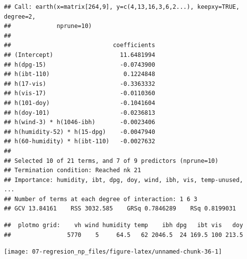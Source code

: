\documentclass[
  spanish,
]{book}
\newenvironment{Shaded}{\begin{snugshade}}{\end{snugshade}}
\newcommand{\CommentTok}[1]{\textcolor[rgb]{0.56,0.35,0.01}{\textit{#1}}}
\newcommand{\DataTypeTok}[1]{\textcolor[rgb]{0.13,0.29,0.53}{#1}}
\newcommand{\DecValTok}[1]{\textcolor[rgb]{0.00,0.00,0.81}{#1}}
\newcommand{\KeywordTok}[1]{\textcolor[rgb]{0.13,0.29,0.53}{\textbf{#1}}}
\newcommand{\NormalTok}[1]{#1}
\newcommand{\OperatorTok}[1]{\textcolor[rgb]{0.81,0.36,0.00}{\textbf{#1}}}
\newcommand{\StringTok}[1]{\textcolor[rgb]{0.31,0.60,0.02}{#1}}
\theoremstyle{break}
\theoremstyle{definition}
\theoremstyle{definition}
\theoremstyle{definition}
\theoremstyle{remark}
\begin{document}
\begin{verbatim}
## Call: earth(x=matrix[264,9], y=c(4,13,16,3,6,2...), keepxy=TRUE, degree=2,
##             nprune=10)
## 
##                             coefficients
## (Intercept)                   11.6481994
## h(dpg-15)                     -0.0743900
## h(ibt-110)                     0.1224848
## h(17-vis)                     -0.3363332
## h(vis-17)                     -0.0110360
## h(101-doy)                    -0.1041604
## h(doy-101)                    -0.0236813
## h(wind-3) * h(1046-ibh)       -0.0023406
## h(humidity-52) * h(15-dpg)    -0.0047940
## h(60-humidity) * h(ibt-110)   -0.0027632
## 
## Selected 10 of 21 terms, and 7 of 9 predictors (nprune=10)
## Termination condition: Reached nk 21
## Importance: humidity, ibt, dpg, doy, wind, ibh, vis, temp-unused, ...
## Number of terms at each degree of interaction: 1 6 3
## GCV 13.84161    RSS 3032.585    GRSq 0.7846289    RSq 0.8199031
\end{verbatim}

\begin{Shaded}
\end{Shaded}

\begin{verbatim}
##  plotmo grid:    vh wind humidity temp    ibh dpg   ibt vis   doy
##                5770    5     64.5   62 2046.5  24 169.5 100 213.5
\end{verbatim}

\begin{center}\texttt{[image: 07-regresion\_np\_files/figure-latex/unnamed-chunk-36-1]} \end{center}

\begin{Shaded}
\end{Shaded}
\end{document}
